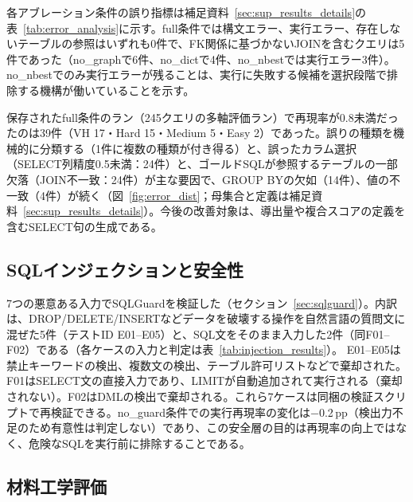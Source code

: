 \documentclass[twocolumn]{interact}
\begin{document}
各アブレーション条件の誤り指標は補足資料~\ref{sec:sup_results_details}の表~\ref{tab:error_analysis}に示す。full条件では構文エラー、実行エラー、存在しないテーブルの参照はいずれも0件で、FK関係に基づかないJOINを含むクエリは5件であった（no\_graphで6件、no\_dictで4件、no\_nbestでは実行エラー3件）。no\_nbestでのみ実行エラーが残ることは、実行に失敗する候補を選択段階で排除する機構が働いていることを示す。

保存されたfull条件のラン（245クエリの多軸評価ラン）で再現率が0.8未満だったのは39件（VH 17・Hard 15・Medium 5・Easy 2）であった。誤りの種類を機械的に分類する（1件に複数の種類が付き得る）と、誤ったカラム選択（SELECT列精度0.5未満：24件）と、ゴールドSQLが参照するテーブルの一部欠落（JOIN不一致：24件）が主な要因で、GROUP BYの欠如（14件）、値の不一致（4件）が続く（図~\ref{fig:error_dist}；母集合と定義は補足資料~\ref{sec:sup_results_details}）。今後の改善対象は、導出量や複合スコアの定義を含むSELECT句の生成である。


\subsection{SQLインジェクションと安全性}

\label{sec:injection_safety}

7つの悪意ある入力でSQLGuardを検証した（セクション~\ref{sec:sqlguard}）。内訳は、DROP/DELETE/INSERTなどデータを破壊する操作を自然言語の質問文に混ぜた5件（テストID E01--E05）と、SQL文をそのまま入力した2件（同F01--F02）である（各ケースの入力と判定は表~\ref{tab:injection_results}）。
E01--E05は禁止キーワードの検出、複数文の検出、テーブル許可リストなどで棄却された。F01はSELECT文の直接入力であり、LIMITが自動追加されて実行される（棄却されない）。F02はDMLの検出で棄却される。これら7ケースは同梱の検証スクリプトで再検証できる。no\_guard条件での実行再現率の変化は$-$0.2\,pp（検出力不足のため有意性は判定しない）であり、この安全層の目的は再現率の向上ではなく、危険なSQLを実行前に排除することである。


\subsection{材料工学評価}
\label{sec:materials_evaluation}
\end{document}
